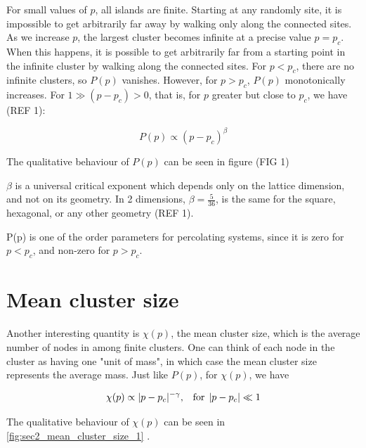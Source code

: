 For small values of $p$, all islands are finite. Starting at any randomly site, it is impossible to get arbitrarily far away by walking only along the connected sites. As we increase $p$, the largest cluster becomes infinite at a precise value $p = p_c$. When this happens, it is possible to get arbitrarily far from a starting point in the infinite cluster by walking along the connected sites. For $p < p_c$, there are no infinite clusters, so $P(p)$ vanishes. However, for $p > p_c$, $P(p)$ monotonically increases. For $1 \gg (p - p_c) > 0$, that is, for $p$ greater  but close to $p_c$, we have (REF 1):

$$
    P(p) \propto (p - p_c)^\beta 
$$

The qualitative behaviour of $P(p)$ can be seen in figure (FIG 1)


$\beta$ is a universal critical exponent which depends only on the lattice dimension, and not on its geometry. In 2 dimensions, $\beta = \frac{5}{36}$, is the same for the square, hexagonal, or any other geometry (REF 1). 

P(p) is one of the order parameters for percolating systems, since it is zero for $p < p_c$, and non-zero for $p > p_c$.


\section{Mean cluster size}
\label{sec:th_mean_cluster_size}

Another interesting quantity is $\chi(p)$, the mean cluster size, which is the average number of nodes in among finite clusters. One can think of each node in the cluster as having one "unit of mass", in which case the mean cluster size represents the average mass. Just like $P(p)$, for $\chi(p)$, we have

$$ 
    \chi(p) \propto  |p - p_c|^{-\gamma} \textrm{,} \hspace{0.35cm}  \textrm{for} \hspace{0.15cm} |p - p_c| \ll 1 
$$ 

The qualitative behaviour of $\chi(p)$ can be seen in \autoref{fig:sec2_mean_cluster_size_1}
.

